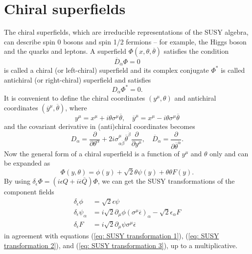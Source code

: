 \documentclass[12pt]{report}
\begin{document}
\section{Chiral superfields}
The chiral superfields, which are irreducible representations of the SUSY algebra, can describe spin 0 bosons and spin 1/2 fermions -- for example, the Higgs boson and the quarks and leptons.
A superfield $\Phi (x, \theta, \overline{\theta})$ satisfies the condition
\begin{equation} \label{eq: definition of chiral superfield}
\overline{D}_{\dot{\alpha}} \Phi =0
\end{equation}
 is called a chiral (or left-chiral) superfield and its complex conjugate $\Phi^{*}$ is called antichiral (or right-chiral) superfield and satisfies
 \begin{equation} \label{eq: definition of antichiral superfield}
D_{\alpha} \Phi^{*} = 0.
\end{equation}
It is convenient to define the chiral coordinates $(y^{\mu}, \theta)$ and antichiral coordinates $(\overline{y}^{\mu}, \overline{\theta})$, where
\begin{equation}
y^{\mu} = x^{\mu} + i \theta \sigma^{\mu} \overline{\theta}, \quad 
\overline{y}^{\mu} = x^{\mu} - i \theta \sigma^{\mu} \overline{\theta}
\end{equation}
and the covariant derivative in (anti)chiral coordinates becomes
\begin{equation}
D_{\alpha} = \frac{\partial}{\partial \theta^{\alpha}} + 2 i \sigma^{\mu}_{\alpha \dot{\beta}} \overline{\theta}^{\dot{\beta}} \frac{\partial}{\partial y^{\mu}}, \quad 
\overline{D}_{\dot{\alpha}} = \frac{\partial}{\partial \overline{\theta}^{\dot{\alpha}}} .
\end{equation}
Now the general form of a chiral superfield is a function of $y^{\mu}$ and $\theta$ only and can be expanded as
\begin{equation}
\Phi (y, \theta) = \phi (y) + \sqrt{2} \theta \psi (y) + \theta \theta F(y) .
\end{equation}
By using $\delta_{\epsilon} \Phi = (i \epsilon Q + i \overline{\epsilon} \overline{Q}) \Phi$, we can get the SUSY transformations of the component fields
\begin{align} 
\delta_{\epsilon} \phi &= \sqrt{2} \epsilon \psi \label{eq: SUSY transformation 4}\\
\delta_{\epsilon} \psi_{\alpha} &= i \sqrt{2}  \partial_{\mu} \phi (\sigma^{\mu} \overline{\epsilon})_{\alpha} - \sqrt{2} \epsilon_{\alpha} F \label{eq: SUSY transformation 5}\\
\delta_{\epsilon} F &= i \sqrt{2}  \partial_{\mu} \psi \sigma^{\mu} \overline{\epsilon} \label{eq: SUSY transformation 6}
\end{align}
in agreement with equations (\ref{eq: SUSY transformation 1}), (\ref{eq: SUSY transformation 2}), and (\ref{eq: SUSY transformation 3}), up to a multiplicative.
\end{document}
